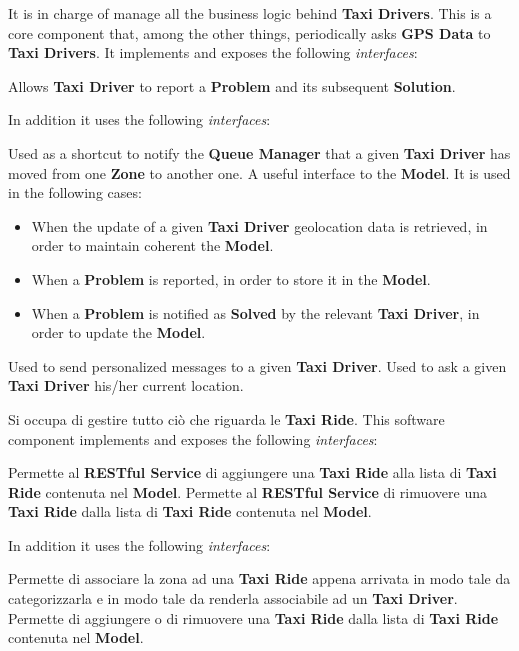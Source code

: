 \begin{itemize}
\begin{itemize}
		 It is in charge of manage all the business logic behind \textbf{Taxi Drivers}.
		This is a core component that, among the other things, periodically asks \textbf{GPS Data} to \textbf{Taxi Drivers}.
		It implements and exposes the following \textit{interfaces}:
		\begin{itemize}
			 Allows \textbf{Taxi Driver} to report a \textbf{Problem} and its subsequent \textbf{Solution}.
		\end{itemize}
		In addition it uses the following \textit{interfaces}:
		\begin{itemize}
			 Used as a shortcut to notify the \textbf{Queue Manager} that a given \textbf{Taxi Driver} has moved from one \textbf{Zone} to another one.
			 A useful interface to the \textbf{Model}.
			It is used in the following cases:
			\begin{itemize}
				\item When the update of a given \textbf{Taxi Driver} geolocation data is retrieved, in order to maintain coherent the \textbf{Model}.
				\item When a \textbf{Problem} is reported, in order to store it in the \textbf{Model}.
				\item When a \textbf{Problem} is notified as \textbf{Solved} by the relevant \textbf{Taxi Driver}, in order to update the \textbf{Model}.
			\end{itemize}
			 Used to send personalized messages to a given \textbf{Taxi Driver}.
			 Used to ask a given \textbf{Taxi Driver} his/her current location.
		\end{itemize}
		
		 Si occupa di gestire tutto ciò che riguarda le \textbf{Taxi Ride}.
		This software component implements and exposes the following \textit{interfaces}:
		\begin{itemize}
			 Permette al \textbf{RESTful Service} di aggiungere una \textbf{Taxi Ride} alla lista di \textbf{Taxi Ride} contenuta nel \textbf{Model}.
			Permette al \textbf{RESTful Service} di rimuovere una \textbf{Taxi Ride} dalla lista di \textbf{Taxi Ride} contenuta nel \textbf{Model}.
		\end{itemize}
		In addition it uses the following \textit{interfaces}:
		\begin{itemize}
			 Permette di associare la zona ad una \textbf{Taxi Ride} appena arrivata in modo tale da categorizzarla e in modo tale da renderla associabile ad un \textbf{Taxi Driver}.
			 Permette di aggiungere o di rimuovere una \textbf{Taxi Ride} dalla lista di \textbf{Taxi Ride} contenuta nel \textbf{Model}.
		\end{itemize} 
		

\end{itemize}
\end{itemize}
